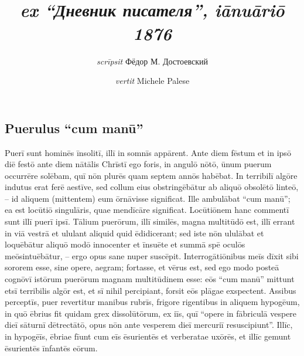 \documentclass[a4paper, 12pt]{article}
\title{
	\MyTitle\\
	\large\textit{ex ``\emph{Дневник писателя}'', iānuāriō 1876}
}
\author{\textit{scrīpsit} Фёдор М. Достоевский \and \textit{vertit} Michele Palese}
\date{}
\newcommand{\red}[1]{{\color{red}  {#1}}}
\newcommand{\DisableFootNotes}{%
	\renewcommand{\footnote}[2][]{\relax}
}
\begin{document}
	
	\maketitle
	
	\DisableFootNotes
	
	\resetlinenumber
\begin{linenumbers}
	
	\section{Puerulus ``cum manū''}
	
	Puerī sunt hominēs īnsolitī, illī in somnīs appārent.
	Ante diem fēstum et in ipsō diē festō ante diem nātālis Chrīstī ego foris, in angulō nōtō, ūnum puerum occurrēre solēbam, quī nōn plurēs quam septem annōs habēbat.
	In terribilī algōre\footnote{algor, algōris, \textit{m} = magnum frigidum} indutus erat ferē\footnote{ferē = prope} aestīve\footnote{aestīve < aestās}, sed collum eius obstringēbātur ab aliquō obsolētō linteō\footnote{linteum, linteī, \textit{n}}, -- id aliquem \red{(mittentem)} eum ōrnāvisse significat.
	Ille ambulābat ``cum manū''; ea est locūtiō singulāris, quae mendīcāre\footnote{mendīcō, mendīcās, mendīcāvī, mendīcātum, mendīcāre = pecuniam poscō} significat.
	Locūtiōnem hanc commentī sunt\footnote{commīniscor, commīnisceris, commentus sum, commīniscī = excōgitō} illī puerī ipsī.
	Tālium puerōrum, illī similēs, magna multitūdō est, illī errant in viā vestrā et ululant aliquid quid ēdidicerant\footnote{ēdiscō = discō ut meminī};
	sed iste nōn ululābat et loquēbātur aliquō modō innocenter et īnsuēte et summā spē oculōs meōsintuēbātur\footnote{intueor, intuēris, intuitus sum, intuērī = aspiciō},
	-- ergo opus sane nuper suscēpit\footnote{opus suscipiō = laborare incipiō}.
	Interrogātiōnibus meīs dīxit sibi sororem esse, sine opere, aegram;
	fortasse, et vērus est, sed ego modo posteā cognōvī istōrum puerōrum magnam multitūdinem esse:
	eōs ``cum manū'' mittunt etsī terribilis algōr est, et sī nihil percipiant, forsit eōs \red{plāgae exspectent}\footnote{eōs plāgae exspectent = verberentur}.
	Assibus perceptīs, puer revertitur manibus rubrīs, frigore rigentibus\footnote{frigore rigēns = ob frigorem movī nōn potest} in aliquem hypogēum\footnote{hypogēum, hypogēī, \textit{n} = pars domūs subterranea}, in quō ēbrius fit quidam grex dissolūtōrum, ex iīs, quī ``opere in fābriculā vespere dieī sāturnī dētrectātō, opus nōn ante vesperem dieī mercuriī resuscipiunt''.
	Illīc, in hypogēīs, ēbriae fīunt cum eīs ēsurientēs\footnote{ēsuriēns, ēsurientis = is qui cibō carēt} et verberatae uxōrēs, et illīc gemunt\footnote{gemō, gemis, gemuī, gemitum, gemere $\approx$ vāgiō} ēsurientēs īnfantēs eōrum.

\end{linenumbers}
\end{document}
